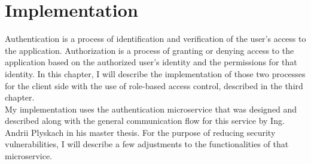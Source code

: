\chapter{Implementation}
Authentication is a process of identification and verification of the user's access to the application. Authorization is a process of granting or denying access to the application based on the authorized user's identity and the permissions for that identity. In this chapter, I will describe the implementation of those two processes for the client side with the use of role-based access control, described in the third chapter.\\
My implementation uses the authentication microservice that was designed and described along with the general communication flow for this service by Ing. Andrii Plyskach in his master thesis\cite{mt-plyskach}. For the purpose of reducing security vulnerabilities, I will describe a few adjustments to the functionalities of that microservice.




























